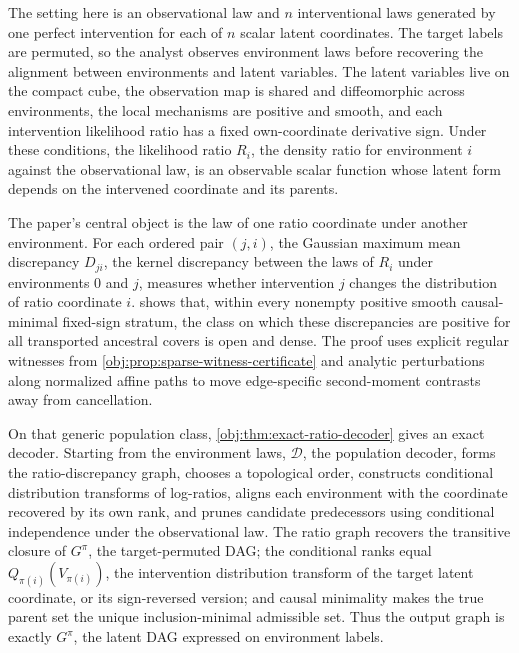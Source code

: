 \documentclass[11pt]{article}
\begin{document}
The setting here is an observational law and \(n\) interventional laws generated by one perfect intervention for each of \(n\) scalar latent coordinates. The target labels are permuted, so the analyst observes environment laws before recovering the alignment between environments and latent variables. The latent variables live on the compact cube, the observation map is shared and diffeomorphic across environments, the local mechanisms are positive and smooth, and each intervention likelihood ratio has a fixed own-coordinate derivative sign. Under these conditions, the likelihood ratio \(R_i\), the density ratio for environment \(i\) against the observational law, is an observable scalar function whose latent form depends on the intervened coordinate and its parents.

The paper's central object is the law of one ratio coordinate under another environment. For each ordered pair \((j,i)\), the Gaussian maximum mean discrepancy \(D_{ji}\), the kernel discrepancy between the laws of \(R_i\) under environments \(0\) and \(j\), measures whether intervention \(j\) changes the distribution of ratio coordinate \(i\).  shows that, within every nonempty positive smooth causal-minimal fixed-sign stratum, the class on which these discrepancies are positive for all transported ancestral covers is open and dense. The proof uses explicit regular witnesses from \cref{obj:prop:sparse-witness-certificate} and analytic perturbations along normalized affine paths to move edge-specific second-moment contrasts away from cancellation.

On that generic population class, \cref{obj:thm:exact-ratio-decoder} gives an exact decoder. Starting from the environment laws, \(\mathscr D\), the population decoder, forms the ratio-discrepancy graph, chooses a topological order, constructs conditional distribution transforms of log-ratios, aligns each environment with the coordinate recovered by its own rank, and prunes candidate predecessors using conditional independence under the observational law. The ratio graph recovers the transitive closure of \(G^\pi\), the target-permuted DAG; the conditional ranks equal \(Q_{\pi(i)}(V_{\pi(i)})\), the intervention distribution transform of the target latent coordinate, or its sign-reversed version; and causal minimality makes the true parent set the unique inclusion-minimal admissible set. Thus the output graph is exactly \(G^\pi\), the latent DAG expressed on environment labels.
\end{document}
